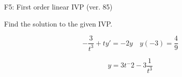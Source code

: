 \begin{exercise}
  \begin{exerciseTitle}F5: First order linear IVP (ver. 85)\end{exerciseTitle}
  \begin{exerciseStatement}
    
Find the solution to the given IVP.

    
\[-\frac{3}{t^{3}} +ty'= -2 y \hspace{1em} y( -3 ) = \frac{4}{9}\]

  \end{exerciseStatement}
  \begin{exerciseAnswer}
    
\[y= 3 t^ -2 -3 \frac{1}{t^{3}}\]

  \end{exerciseAnswer}
\end{exercise}